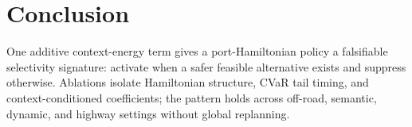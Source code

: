 \documentclass{article}
\theoremstyle{definition}
\begin{document}
\begin{abstract}
\end{abstract}







\section{Conclusion}
\label{sec:conclusion}

One additive context-energy term gives a port-Hamiltonian policy a falsifiable
selectivity signature: activate when a safer feasible alternative exists and
suppress otherwise.  Ablations isolate Hamiltonian structure, CVaR tail timing,
and context-conditioned coefficients; the pattern holds across off-road,
semantic, dynamic, and highway settings without global replanning.
\end{document}
